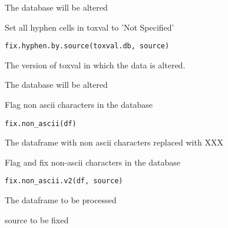 \documentclass[letterpaper]{book}
\begin{document}
%
\begin{Value}
The database will be altered
\end{Value}
%
\begin{Description}\relax
Set all hyphen cells in toxval to 'Not Specified'
\end{Description}
%
\begin{Usage}
\begin{verbatim}
fix.hyphen.by.source(toxval.db, source)
\end{verbatim}
\end{Usage}
%
\begin{Arguments}
\begin{ldescription}
\item[\code{toxval.db}] The version of toxval in which the data is altered.
\end{ldescription}
\end{Arguments}
%
\begin{Value}
The database will be altered
\end{Value}
%
\begin{Description}\relax
Flag non ascii characters in the database
\end{Description}
%
\begin{Usage}
\begin{verbatim}
fix.non_ascii(df)
\end{verbatim}
\end{Usage}
%
\begin{Value}
The dataframe with non ascii characters replaced with XXX
\end{Value}
%
\begin{Description}\relax
Flag and fix non-ascii characters in the database
\end{Description}
%
\begin{Usage}
\begin{verbatim}
fix.non_ascii.v2(df, source)
\end{verbatim}
\end{Usage}
%
\begin{Arguments}
\begin{ldescription}
\item[\code{df}] The dataframe to be processed

\item[\code{The}] source to be fixed
\end{ldescription}
\end{Arguments}
\end{document}

